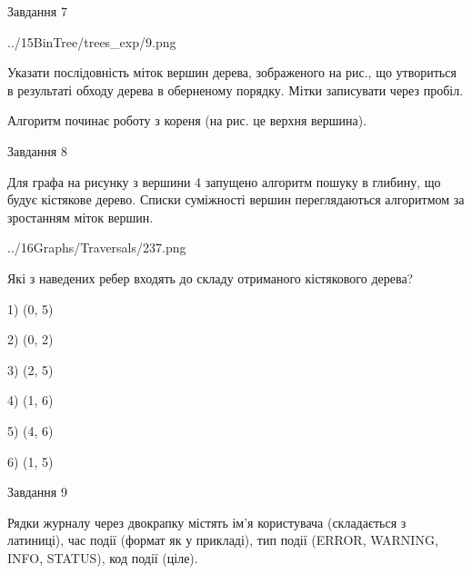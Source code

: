 \documentclass[12pt, ukrainian]{article}
\begin{document}
{\vspace{10mm}\par

\newpage
\begin{minipage}[t]{9.7cm}
               
{\begin{center}Завдання {7}\end{center}}
\vspace{-4mm}

\begin{center}
	{../15BinTree/trees_exp/9.png}
\end{center}
Указати послідовність міток вершин дерева, зображеного на рис., що утвориться в результаті обходу дерева в оберненому порядку. Мітки записувати через пробіл.\par Алгоритм починає роботу з кореня (на рис. це верхня вершина).\par

\end{minipage}
\vline \hspace{8mm}
\begin{minipage}[t]{8.0cm}
               
{\begin{center}Завдання {8}\end{center}}
\vspace{-4mm}
Для графа на рисунку з вершини 4 запущено алгоритм пошуку в глибину, що будує кістякове дерево. Списки суміжності вершин переглядаються алгоритмом за зростанням міток вершин.\par
\begin{center}
	{../16Graphs/Traversals/237.png}
\end{center}
\par Які з наведених ребер входять до складу отриманого кістякового дерева?\par
1) (0, 5)\par
2) (0, 2)\par
3) (2, 5)\par
4) (1, 6)\par
5) (4, 6)\par
6) (1, 5)\par
{\vskip 15pt} \par

\end{minipage}

               
{\begin{center}Завдання {9}\end{center}}
\vspace{-4mm}
Рядки журналу через двокрапку містять ім'я користувача (складається з латиниці), час події (фор\-мат як у прикладі), тип події (ERROR, WARNING, INFO, STATUS), код події (ціле).

}
\end{document}
